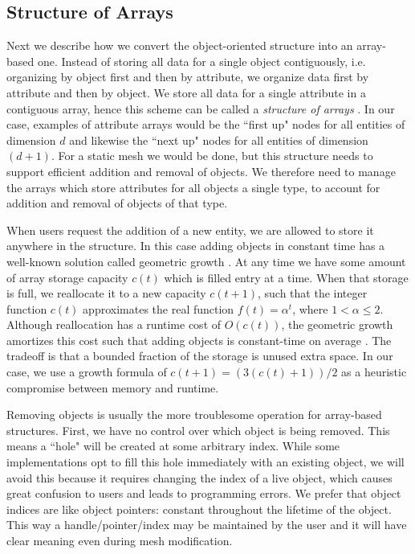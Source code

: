 \subsection{Structure of Arrays}
\label{sec:sisc_soa}

Next we describe how we convert the object-oriented structure
into an array-based one.
Instead of storing all data for a single object contiguously,
i.e. organizing by object first and then by attribute,
we organize data first by attribute and then by object.
We store all data for a single attribute in a contiguous
array, hence this scheme can be called a {\it structure of arrays}
\cite{sung2012dl}.
In our case, examples of attribute arrays would be
the ``first up" nodes for all entities of dimension $d$
and likewise the ``next up" nodes for all entities of dimension $(d+1)$.
For a static mesh we would be done, but this structure needs
to support efficient addition and removal of objects.
We therefore need to manage the arrays which store attributes
for all objects a single type, to account for addition and removal
of objects of that type.

When users request the addition of a new entity, we are allowed
to store it anywhere in the structure.
In this case adding objects in constant time has a well-known
solution called geometric growth \cite{cormen2001table}.
At any time we have some amount of array storage capacity $c(t)$
which is filled entry at a time.
When that storage is full, we reallocate it to a new capacity $c(t+1)$,
such that the integer function $c(t)$ approximates the real function
$f(t) = \alpha^t$, where $1< \alpha\leq 2$.
Although reallocation has a runtime cost of $O(c(t))$, the geometric
growth amortizes this cost such that adding objects
is constant-time on average \cite{cormen2001table}.
The tradeoff is that a bounded fraction of the storage is unused extra space.
In our case, we use a growth formula of $c(t+1) = (3(c(t)+1))/2$
as a heuristic compromise between memory and runtime.

Removing objects is usually the more troublesome operation for
array-based structures.
First, we have no control over which object is being removed.
This means a ``hole" will be created at some arbitrary index.
While some implementations opt to fill this hole immediately
with an existing object, we will avoid this because it requires
changing the index of a live object,
which causes great confusion to users
and leads to programming errors.
We prefer that object indices are like object pointers: constant
throughout the lifetime of the object.
This way a handle/pointer/index may be maintained by the user
and it will have clear meaning even during mesh modification.

